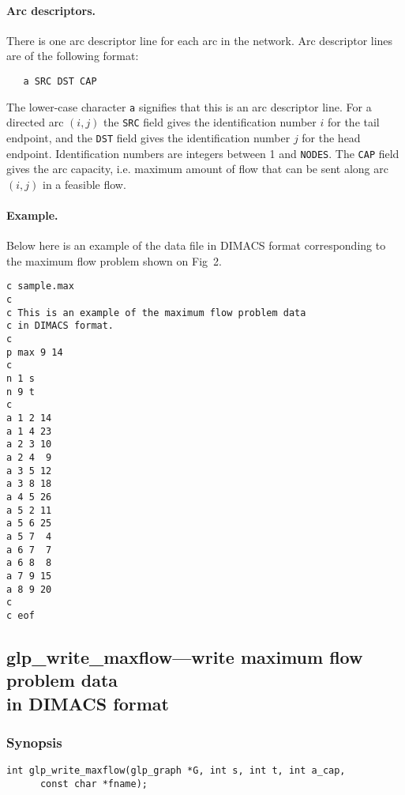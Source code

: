 \documentclass[dvipdfm,11pt]{report}
\begin{document}
\paragraph{Arc descriptors.} There is one arc descriptor line for each
arc in the network. Arc descriptor lines are of the following format:

\begin{verbatim}
   a SRC DST CAP
\end{verbatim}

\noindent
The lower-case character \verb|a| signifies that this is an arc
descriptor line. For a directed arc $(i,j)$ the \verb|SRC| field gives
the identification number $i$ for the tail endpoint, and the \verb|DST|
field gives the identification number $j$ for the head endpoint.
Identification numbers are integers between 1 and \verb|NODES|. The
\verb|CAP| field gives the arc capacity, i.e. maximum amount of flow
that can be sent along arc $(i,j)$ in a feasible flow.

\paragraph{Example.} Below here is an example of the data file in
DIMACS format corresponding to the maximum flow problem shown on Fig~2.

\newpage

\begin{footnotesize}
\begin{verbatim}
c sample.max
c
c This is an example of the maximum flow problem data
c in DIMACS format.
c
p max 9 14
c
n 1 s
n 9 t
c
a 1 2 14
a 1 4 23
a 2 3 10
a 2 4  9
a 3 5 12
a 3 8 18
a 4 5 26
a 5 2 11
a 5 6 25
a 5 7  4
a 6 7  7
a 6 8  8
a 7 9 15
a 8 9 20
c
c eof
\end{verbatim}
\end{footnotesize}

\subsection{glp\_write\_maxflow---write maximum flow problem data\\
in DIMACS format}

\subsubsection*{Synopsis}

\begin{verbatim}
int glp_write_maxflow(glp_graph *G, int s, int t, int a_cap,
      const char *fname);
\end{verbatim}
\end{document}
